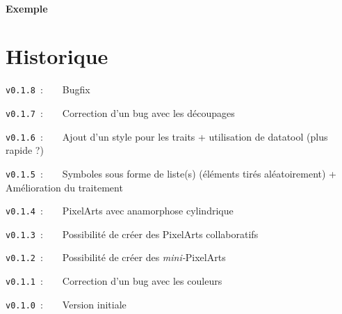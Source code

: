 \documentclass{article}
\begin{document}
\subsection{Exemple}

\begin{PresentationCode}{}


\end{PresentationCode}

\pagebreak

\part{Historique}

\verb|v0.1.8|~:~~~~Bugfix

\verb|v0.1.7|~:~~~~Correction d'un bug avec les découpages

\verb|v0.1.6|~:~~~~Ajout d'un style pour les traits + utilisation de \textsf{datatool} (plus rapide ?)

\verb|v0.1.5|~:~~~~Symboles sous forme de liste(s) (éléments tirés aléatoirement) + Amélioration du traitement

\verb|v0.1.4|~:~~~~PixelArts avec anamorphose cylindrique

\verb|v0.1.3|~:~~~~Possibilité de créer des PixelArts collaboratifs

\verb|v0.1.2|~:~~~~Possibilité de créer des \textit{mini-}PixelArts

\verb|v0.1.1|~:~~~~Correction d'un bug avec les couleurs

\verb|v0.1.0|~:~~~~Version initiale
\end{document}
